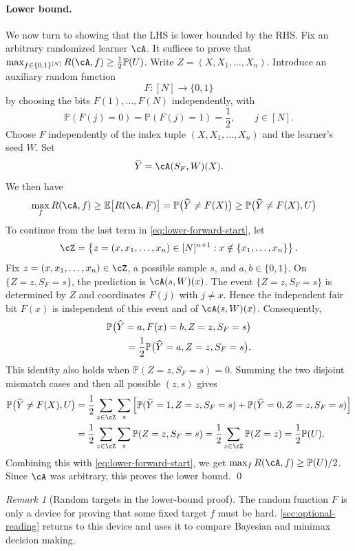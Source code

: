 \documentclass[11pt,twoside]{article}
\renewcommand{\P}{\mathbb P}
\theoremstyle{definition}
\theoremstyle{remark}
\newtheorem{remark}[theorem]{Remark}
\begin{document}
\paragraph{Lower bound.}
We now turn to showing that the LHS is lower bounded by the RHS. Fix an
arbitrary randomized learner $\cA$.
It suffices to prove that $\max_{f\in \{0,1\}^{[N]}} R(\cA,f) \ge \frac12 \P(U)$.
Write $Z=(X,X_1,\ldots,X_n)$. Introduce an auxiliary random function
\[
F:[N]\longrightarrow\{0,1\}
\]
by choosing the bits $F(1),\ldots,F(N)$ independently, with
\[
\P(F(j)=0)=\P(F(j)=1)=\frac12,
\qquad j\in[N].
\]
Choose $F$ independently of the index tuple $(X,X_1,\ldots,X_n)$ and the
learner's seed $W$. Set
\[
\widehat Y=\cA(S_F,W)(X).
\]
We then have
\begin{align}
\max_f R(\cA,f)
&\ge \mathbb E\bigl[R(\cA,F)\bigr]
=\P\bigl(\widehat Y\ne F(X)\bigr)
\ge \P\bigl(\widehat Y\ne F(X),U\bigr)
\label{eq:lower-forward-start}
\end{align}
To continue from the last term in \cref{eq:lower-forward-start}, let
\[
\cZ=
\left\{z=(x,x_1,\ldots,x_n)\in[N]^{n+1}:
x\notin\{x_1,\ldots,x_n\}\right\}.
\]
Fix $z=(x,x_1,\ldots,x_n)\in\cZ$, a possible sample $s$, and
$a,b\in\{0,1\}$. On $\{Z=z,S_F=s\}$, the prediction is
$\cA(s,W)(x)$. The event $\{Z=z,S_F=s\}$ is determined by $Z$ and
coordinates $F(j)$ with $j\ne x$. Hence the independent fair bit $F(x)$
is independent of this event and of $\cA(s,W)(x)$. Consequently,
\begin{align}
&\P\bigl(\widehat Y=a,F(x)=b,Z=z,S_F=s\bigr)\notag\\
&\qquad=\frac12\P\bigl(\widehat Y=a,Z=z,S_F=s\bigr).
\label{eq:unconditional-hidden-bit}
\end{align}
This identity also holds when $\P(Z=z,S_F=s)=0$. Summing the two disjoint
mismatch cases and then all possible $(z,s)$ gives
\begin{align*}
\P\bigl(\widehat Y\ne F(X),U\bigr)
&=\frac12\sum_{z\in\cZ}\sum_s
\left[
\P(\widehat Y=1,Z=z,S_F=s)
+\P(\widehat Y=0,Z=z,S_F=s)
\right]\\
&=\frac12\sum_{z\in\cZ}\sum_s\P(Z=z,S_F=s)
=\frac12\sum_{z\in\cZ}\P(Z=z)
=\frac12\P(U).
\end{align*}
Combining this with \cref{eq:lower-forward-start},
we get $\max_f R(\cA,f)\ge \P(U)/2$. Since $\cA$ was arbitrary, this proves
the lower bound.
\qed

\begin{remark}[Random targets in the lower-bound proof]
\label{rem:random-target-proof}
The random function $F$ is only a device for proving that some fixed target
$f$ must be hard. \cref{sec:optional-reading} returns to this device
and uses it to compare Bayesian and minimax decision making.
\end{remark}
\end{document}
